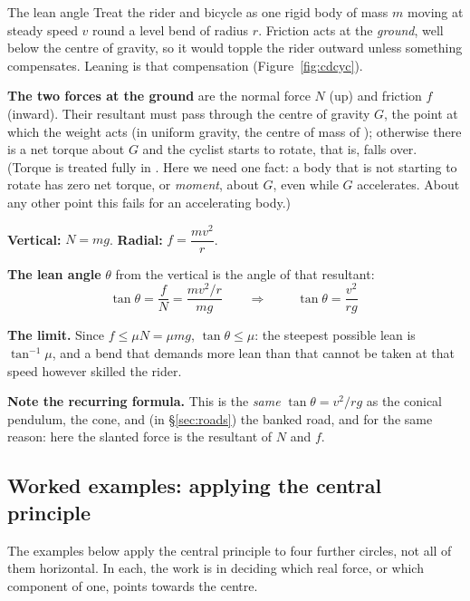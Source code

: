\begin{derivbox}{The lean angle}
Treat the rider and bicycle as one rigid body of mass $m$ moving at steady speed $v$ round a level bend
of radius $r$. Friction acts at the \emph{ground}, well below the centre of gravity, so it would topple
the rider outward unless something compensates. Leaning is that compensation (Figure~\ref{fig:cdcyc}).

 \textbf{The two forces at the ground} are the normal force $N$ (up) and friction $f$
(inward). Their resultant must pass through the centre of gravity $G$, the point at which the weight
acts (in uniform gravity, the centre of mass of ); otherwise there is a net torque
about $G$ and the cyclist starts to rotate, that is, falls over. (Torque is treated fully in
. Here we need one fact: a body that is not starting to rotate has zero net torque,
or \emph{moment}, about $G$, even while $G$ accelerates. About any other point this fails for an
accelerating body.)

 \textbf{Vertical:} $N=mg$. \quad \textbf{Radial:} $f=\dfrac{mv^{2}}{r}$.

 \textbf{The lean angle} $\theta$ from the vertical is the angle of that resultant:
\[
\tan\theta=\frac{f}{N}=\frac{mv^{2}/r}{mg}
\qquad\Longrightarrow\qquad
\boxed{\;\tan\theta=\frac{v^{2}}{rg}\;}
\]

 \textbf{The limit.} Since $f\le\mu N=\mu mg$, $\tan\theta\le\mu$: the steepest possible lean is
$\tan^{-1}\mu$, and a bend that demands more lean than that cannot be taken at that speed however
skilled the rider.

\smallskip
\textbf{Note the recurring formula.} This is the \emph{same} $\tan\theta=v^{2}/rg$ as the conical
pendulum, the cone, and (in \S\ref{sec:roads}) the banked road, and for the same reason: here the
slanted force is the resultant of $N$ and $f$.
\end{derivbox}

\subsection{Worked examples: applying the central principle}

The examples below apply the central principle to four further circles, not all of them horizontal. In
each, the work is in deciding which real force, or which component of one, points towards the centre.

\begin{figure}[htbp]
\centering
{}
\end{figure}

